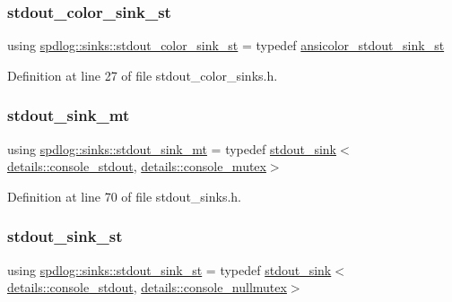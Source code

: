 \subsubsection{\texorpdfstring{stdout\+\_\+color\+\_\+sink\+\_\+st}{stdout\_color\_sink\_st}}
{\footnotesize\ttfamily using \hyperlink{namespacespdlog_1_1sinks_ae3eb6549df72c3c46dea34fd35fee93e}{spdlog\+::sinks\+::stdout\+\_\+color\+\_\+sink\+\_\+st} = typedef \hyperlink{namespacespdlog_1_1sinks_aa30d2f8d27e36f73043723a42199fd7b}{ansicolor\+\_\+stdout\+\_\+sink\+\_\+st}}



Definition at line 27 of file stdout\+\_\+color\+\_\+sinks.\+h.

\mbox{\label{namespacespdlog_1_1sinks_a029d085d53a8f4ee99ba223f34bcfb28}} 
\subsubsection{\texorpdfstring{stdout\+\_\+sink\+\_\+mt}{stdout\_sink\_mt}}
{\footnotesize\ttfamily using \hyperlink{namespacespdlog_1_1sinks_a029d085d53a8f4ee99ba223f34bcfb28}{spdlog\+::sinks\+::stdout\+\_\+sink\+\_\+mt} = typedef \hyperlink{classspdlog_1_1sinks_1_1stdout__sink}{stdout\+\_\+sink}$<$\hyperlink{structspdlog_1_1details_1_1console__stdout}{details\+::console\+\_\+stdout}, \hyperlink{structspdlog_1_1details_1_1console__mutex}{details\+::console\+\_\+mutex}$>$}



Definition at line 70 of file stdout\+\_\+sinks.\+h.

\mbox{\label{namespacespdlog_1_1sinks_a98a1a892c6c8f44d89f2ec13e8a7f2c4}} 
\subsubsection{\texorpdfstring{stdout\+\_\+sink\+\_\+st}{stdout\_sink\_st}}
{\footnotesize\ttfamily using \hyperlink{namespacespdlog_1_1sinks_a98a1a892c6c8f44d89f2ec13e8a7f2c4}{spdlog\+::sinks\+::stdout\+\_\+sink\+\_\+st} = typedef \hyperlink{classspdlog_1_1sinks_1_1stdout__sink}{stdout\+\_\+sink}$<$\hyperlink{structspdlog_1_1details_1_1console__stdout}{details\+::console\+\_\+stdout}, \hyperlink{structspdlog_1_1details_1_1console__nullmutex}{details\+::console\+\_\+nullmutex}$>$}



